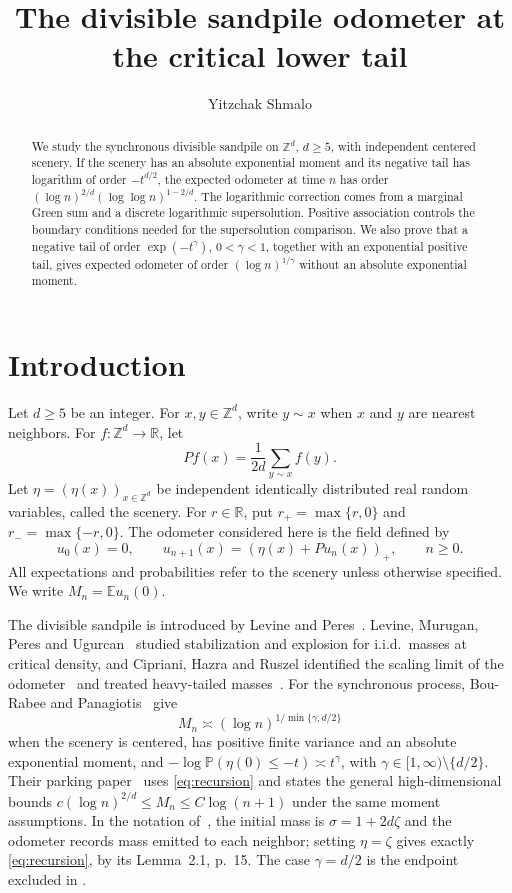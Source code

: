 \documentclass[11pt]{amsart}
\title{The divisible sandpile odometer at the critical lower tail}
\author{Yitzchak Shmalo}
\date{}
\theoremstyle{remark}
\newcommand{\Z}{\mathbb Z}
\newcommand{\Pp}{\mathbb P}
\newcommand{\E}{\mathbb E}
\begin{document}
\begin{abstract}
We study the synchronous divisible sandpile on $\Z^d$, $d\ge5$, with
independent centered scenery. If the scenery has an absolute exponential
moment and its negative tail has logarithm of order $-t^{d/2}$, the expected
odometer at time $n$ has order
$(\log n)^{2/d}(\log\log n)^{1-2/d}$.
The logarithmic correction comes from a marginal Green sum and a discrete
logarithmic supersolution. Positive association controls the boundary
conditions needed for the supersolution comparison. We also prove that a
negative tail of order $\exp(-t^\gamma)$, $0<\gamma<1$, together with an
exponential positive tail, gives expected odometer of order
$(\log n)^{1/\gamma}$ without an absolute exponential moment.
\end{abstract}
\maketitle

\section{Introduction}

Let $d\ge5$ be an integer. For $x,y\in\Z^d$, write $y\sim x$ when $x$ and
$y$ are nearest neighbors. For $f:\Z^d\to\mathbb R$, let
\[
 Pf(x)=\frac1{2d}\sum_{y\sim x}f(y).
\]
Let $\eta=(\eta(x))_{x\in\Z^d}$ be independent identically distributed
real random variables, called the scenery. For $r\in\mathbb R$, put
$r_+=\max\{r,0\}$ and $r_-=\max\{-r,0\}$. The odometer considered here is
the field defined by
\begin{equation}\label{eq:recursion}
 u_0(x)=0,\qquad u_{n+1}(x)=(\eta(x)+Pu_n(x))_+,
 \qquad n\ge0.
\end{equation}
All expectations and probabilities refer to the scenery unless otherwise
specified. We write $M_n=\E u_n(0)$.

The divisible sandpile is introduced by Levine and Peres~\cite{LP}.
Levine, Murugan, Peres and Ugurcan~\cite{LMPU} studied stabilization and
explosion for i.i.d.\ masses at critical density, and Cipriani, Hazra and
Ruszel identified the scaling limit of the odometer~\cite{CHR1} and treated
heavy-tailed masses~\cite{CHR2}.
For the synchronous process, Bou-Rabee and
Panagiotis~\cite[Theorem~1.3(iii)(b), p.~6]{BP} give
\begin{equation}\label{eq:noncritical}
 M_n\asymp(\log n)^{1/\min\{\gamma,d/2\}}
\end{equation}
when the scenery is centered, has positive finite variance and an absolute
exponential moment, and
$-\log\Pp(\eta(0)\le-t)\asymp t^\gamma$, with
$\gamma\in[1,\infty)\setminus\{d/2\}$.
Their parking paper~\cite[Theorem~3.4, p.~14]{Parking} uses
\eqref{eq:recursion} and states the general
high-dimensional bounds
$c(\log n)^{2/d}\le M_n\le C\log(n+1)$ under the same moment assumptions.
In the notation of~\cite{BP}, the initial mass is
$\sigma=1+2d\zeta$ and the odometer records mass emitted to each neighbor;
setting $\eta=\zeta$ gives exactly \eqref{eq:recursion}, by its
Lemma~2.1, p.~15. The case $\gamma=d/2$ is the endpoint excluded in
\cite[Theorem~1.3(iii)(b)]{BP}.
\end{document}
